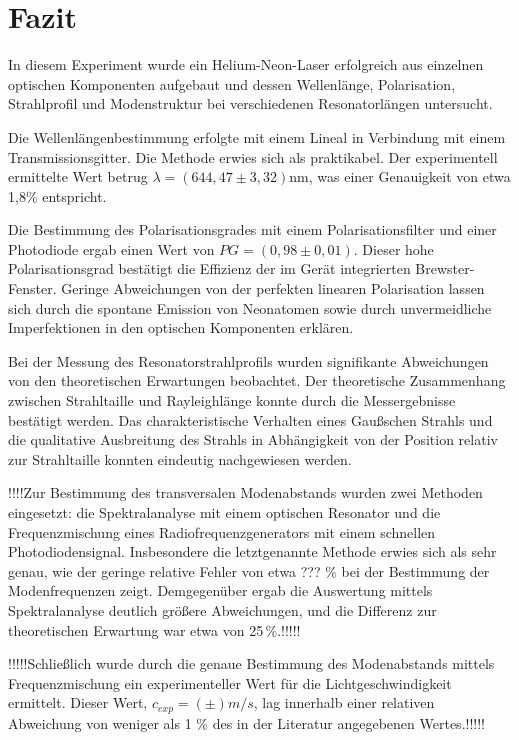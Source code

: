 \chapter{Fazit}
In diesem Experiment wurde ein Helium-Neon-Laser erfolgreich aus einzelnen optischen Komponenten aufgebaut und dessen Wellenlänge, Polarisation, Strahlprofil und Modenstruktur bei verschiedenen Resonatorlängen untersucht.

Die Wellenlängenbestimmung erfolgte mit einem Lineal in Verbindung mit einem Transmissionsgitter. Die Methode erwies sich als praktikabel. Der experimentell ermittelte Wert betrug \(\lambda = (644,47 \pm 3,32)\)nm, was einer Genauigkeit von etwa 1,8\% entspricht.

Die Bestimmung des Polarisationsgrades mit einem Polarisationsfilter und einer Photodiode ergab einen Wert von $PG=(0{,}98 \pm 0{,}01)$. Dieser hohe Polarisationsgrad bestätigt die Effizienz der im Gerät integrierten Brewster-Fenster. Geringe Abweichungen von der perfekten linearen Polarisation lassen sich durch die spontane Emission von Neonatomen sowie durch unvermeidliche Imperfektionen in den optischen Komponenten erklären.

Bei der Messung des Resonatorstrahlprofils wurden signifikante Abweichungen von den theoretischen Erwartungen beobachtet. Der theoretische Zusammenhang zwischen Strahltaille und Rayleighlänge konnte durch die Messergebnisse bestätigt werden. Das charakteristische Verhalten eines Gaußschen Strahls und die qualitative Ausbreitung des Strahls in Abhängigkeit von der Position relativ zur Strahltaille konnten eindeutig nachgewiesen werden.

!!!!Zur Bestimmung des transversalen Modenabstands wurden zwei Methoden eingesetzt: die Spektralanalyse mit einem optischen Resonator und die Frequenzmischung eines Radiofrequenzgenerators mit einem schnellen Photodiodensignal. Insbesondere die letztgenannte Methode erwies sich als sehr genau, wie der geringe relative Fehler von etwa ??? \% bei der Bestimmung der Modenfrequenzen zeigt. Demgegenüber ergab die Auswertung mittels Spektralanalyse deutlich größere Abweichungen, und die Differenz zur theoretischen Erwartung war etwa von 25\,\%.!!!!!

!!!!!Schließlich wurde durch die genaue Bestimmung des Modenabstands mittels Frequenzmischung ein experimenteller Wert für die Lichtgeschwindigkeit ermittelt. Dieser Wert, $c_{exp}=(\pm) m/s$, lag innerhalb einer relativen Abweichung von weniger als 1 \% des in der Literatur angegebenen Wertes.!!!!!
